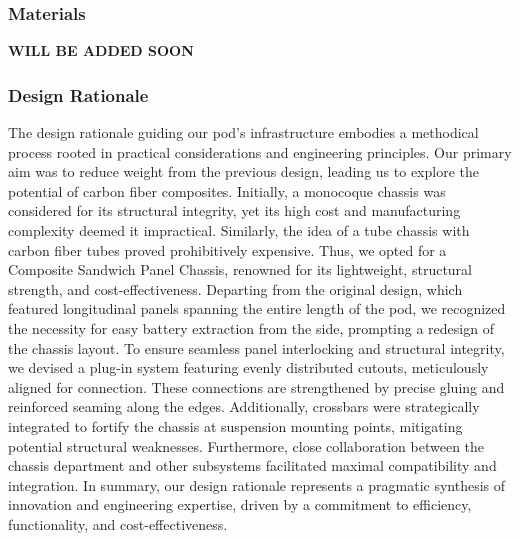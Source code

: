 \subsubsection{Materials}
\textbf{WILL BE ADDED SOON}
\subsubsection{Design Rationale}


The design rationale guiding our pod's infrastructure embodies a methodical process rooted in practical considerations and engineering principles. Our primary aim was to reduce weight from the previous design, leading us to explore the potential of carbon fiber composites.
Initially, a monocoque chassis was considered for its structural integrity, yet its high cost and manufacturing complexity deemed it impractical. Similarly, the idea of a tube chassis with carbon fiber tubes proved prohibitively expensive.
Thus, we opted for a Composite Sandwich Panel Chassis, renowned for its lightweight, structural strength, and cost-effectiveness. Departing from the original design, which featured longitudinal panels spanning the entire length of the pod, we recognized the necessity for easy battery extraction from the side, prompting a redesign of the chassis layout.
To ensure seamless panel interlocking and structural integrity, we devised a plug-in system featuring evenly distributed cutouts, meticulously aligned for connection. These connections are strengthened by precise gluing and reinforced seaming along the edges.
Additionally, crossbars were strategically integrated to fortify the chassis at suspension mounting points, mitigating potential structural weaknesses.
Furthermore, close collaboration between the chassis department and other subsystems facilitated maximal compatibility and integration.
In summary, our design rationale represents a pragmatic synthesis of innovation and engineering expertise, driven by a commitment to efficiency, functionality, and cost-effectiveness.

